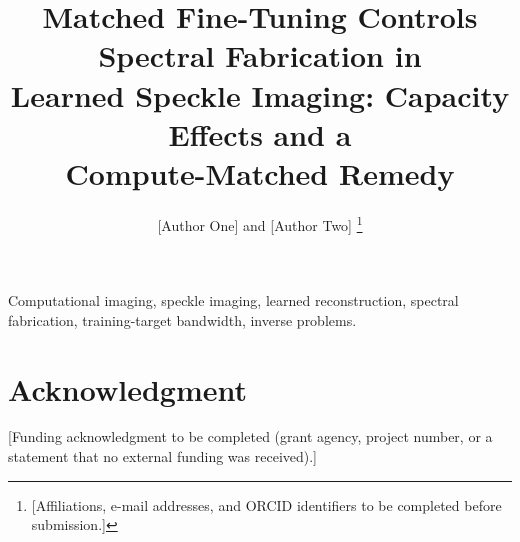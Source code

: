 \documentclass[journal]{IEEEtran}
\begin{document}
\title{Matched Fine-Tuning Controls Spectral Fabrication in\\ Learned Speckle Imaging: Capacity Effects and a\\ Compute-Matched Remedy}

\author{[Author One] and [Author Two]%
\thanks{[Affiliations, e-mail addresses, and ORCID identifiers to be completed before submission.]}}

\maketitle



\begin{IEEEkeywords}
Computational imaging, speckle imaging, learned reconstruction, spectral fabrication, training-target bandwidth, inverse problems.
\end{IEEEkeywords}








\section*{Acknowledgment}
[Funding acknowledgment to be completed (grant agency, project number, or a statement that no external funding was received).]



\end{document}
